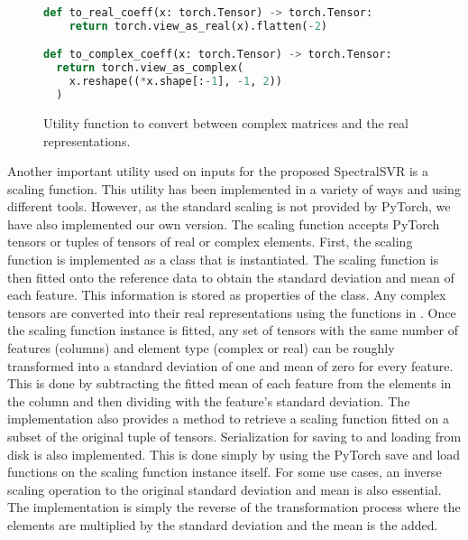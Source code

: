 \begin{figure}[H]
  \centering
  \begin{lstlisting}[language=Python]
def to_real_coeff(x: torch.Tensor) -> torch.Tensor:
    return torch.view_as_real(x).flatten(-2)

def to_complex_coeff(x: torch.Tensor) -> torch.Tensor:
  return torch.view_as_complex(
    x.reshape((*x.shape[:-1], -1, 2))
  )
  \end{lstlisting}
  \caption{Utility function to convert between complex matrices and the real representations.}\label{fig:complex_matrix_conversion_implementation}
\end{figure}

Another important utility used on inputs for the proposed SpectralSVR is a scaling function. This utility has been implemented in a variety of ways and using different tools. However, as the standard scaling is not provided by PyTorch, we have also implemented our own version. The scaling function accepts PyTorch tensors or tuples of tensors of real or complex elements. First, the scaling function is implemented as a class that is instantiated. The scaling function is then fitted onto the reference data to obtain the standard deviation and mean of each feature. This information is stored as properties of the class. Any complex tensors are converted into their real representations using the functions in . Once the scaling function instance is fitted, any set of tensors with the same number of features (columns) and element type (complex or real) can be roughly transformed into a standard deviation of one and mean of zero for every feature. This is done by subtracting the fitted mean of each feature from the elements in the column and then dividing with the feature's standard deviation. The implementation also provides a method to retrieve a scaling function fitted on a subset of the original tuple of tensors. Serialization for saving to and loading from disk is also implemented. This is done simply by using the PyTorch save and load functions on the scaling function instance itself. For some use cases, an inverse scaling operation to the original standard deviation and mean is also essential. The implementation is simply the reverse of the transformation process where the elements are multiplied by the standard deviation and the mean is the added.

